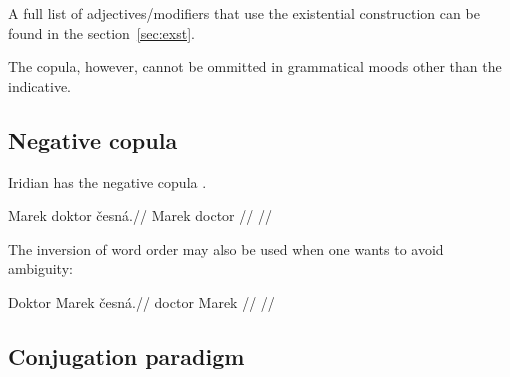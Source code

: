 A full list of adjectives/modifiers that use the existential construction can be found in the section~\ref{sec:exst}.

The copula, however, cannot be ommitted in grammatical moods other than the indicative.

\subsection{Negative copula}

Iridian has the negative copula .

\pex
\begingl
\gla Marek doktor \v{c}esná.//
\glb Marek doctor //
\glft {}//
\endgl
\xe

\par The inversion of word order may also be used when one wants to avoid ambiguity:

\pex
\begingl
\gla Doktor Marek \v{c}esná.//
\glb doctor Marek //
\glft {}//
\endgl
\xe


\subsection{Conjugation paradigm}
